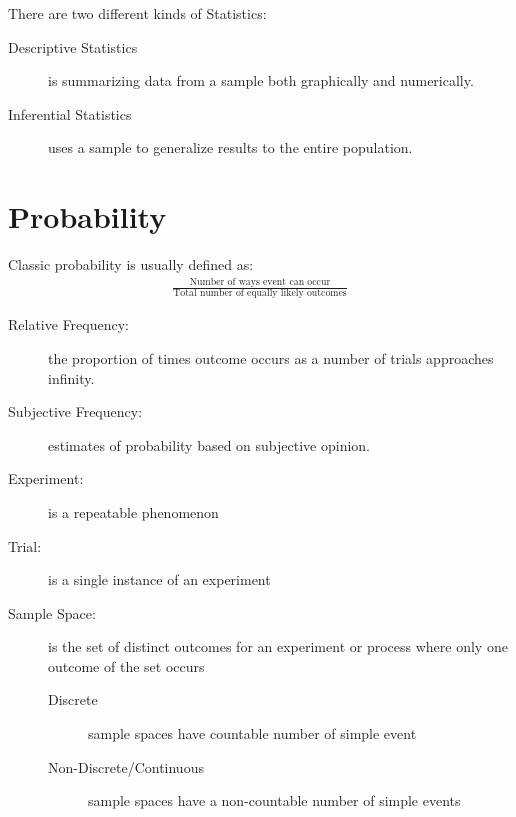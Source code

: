                 There are two different kinds of Statistics:
                \begin{description}
                    \item[Descriptive Statistics] is summarizing data from a sample both graphically and numerically.
                    \item[Inferential Statistics] uses a sample to generalize results to the entire population.
                \end{description}

            \section{Probability} %
            \label{sec:probability}
                Classic probability is usually defined as:
                \begin{align*}
                    \frac{\text{Number of ways event can occur}}{\text{Total number of equally likely outcomes}}
                \end{align*}

                \begin{description}
                    \item[Relative Frequency:] the proportion of times outcome occurs as a number of trials approaches infinity.
                    \item[Subjective Frequency:] estimates of probability based on subjective opinion.
                    \item[Experiment:] is a repeatable phenomenon
                    \item[Trial:] is a single instance of an experiment
                    \item[Sample Space:] is the set of distinct outcomes for an experiment or process where only one outcome of the set occurs
                        \begin{description}
                            \item[Discrete] sample spaces have countable number of simple event
                            \item[Non-Discrete/Continuous] sample spaces have a non-countable number of simple events
                        \end{description}
                \end{description}

